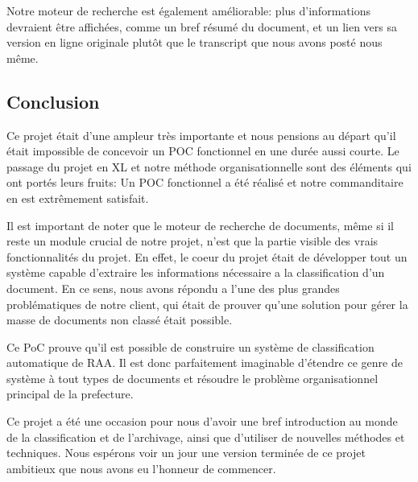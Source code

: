 Notre moteur de recherche est également améliorable: plus d'informations devraient être affichées, comme un bref résumé du document, et un lien vers sa version en ligne originale plutôt que le transcript que nous avons posté nous même.

\subsection {Conclusion}
Ce projet était d'une ampleur très importante et nous pensions au départ qu'il était impossible de concevoir un POC fonctionnel en une durée aussi courte.
Le passage du projet en XL et notre méthode organisationnelle sont des éléments qui ont portés leurs fruits: Un POC fonctionnel a été réalisé et notre commanditaire en est extrêmement satisfait.

Il est important de noter que le moteur de recherche de documents, même si il reste un module crucial de notre projet, n'est que la partie visible des vrais fonctionnalités du projet.
En effet, le coeur du projet était de développer tout un système capable d'extraire les informations nécessaire a la classification d'un document.
En ce sens, nous avons répondu a l'une des plus grandes problématiques de notre client, qui était de prouver qu'une solution pour gérer la masse de documents non classé était possible.

Ce PoC prouve qu'il est possible de construire un système de classification automatique de RAA.
Il est donc parfaitement imaginable d'étendre ce genre de système à tout types de documents et résoudre le problème organisationnel principal de la prefecture.

Ce projet a été une occasion pour nous d'avoir une bref introduction au monde de la classification et de l'archivage, ainsi que d'utiliser de nouvelles méthodes et techniques.
Nous espérons voir un jour une version terminée de ce projet ambitieux que nous avons eu l'honneur de commencer.


